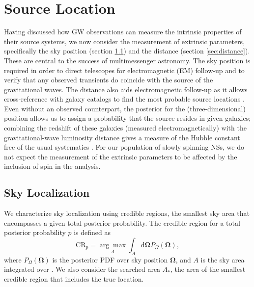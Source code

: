 \section{Source Location}\label{sec:extrinsic}

Having discussed how GW observations can measure the intrinsic properties of their source systems, we now consider the measurement of extrinsic parameters, specifically the sky position (section \ref{sec:sky}) and the distance (section \ref{sec:distance}). These are central to the success of multimessenger astronomy. The sky position is required in order to direct telescopes for electromagnetic (EM) follow-up and to verify that any observed transients do coincide with the source of the gravitational waves. The distance also aids electromagnetic follow-up as it allows cross-reference with galaxy catalogs to find the most probable source locations \citep{Nissanke_2012,Hanna:2013,Fan_2014,Blackburn:2014rqa}. Even without an observed counterpart, the posterior for the (three-dimensional) position allows us to assign a probability that the source resides in given galaxies; combining the redshift of these galaxies (measured electromagnetically) with the gravitational-wave luminosity distance gives a measure of the Hubble constant free of the usual systematics \citep{Schutz_1986,Del_Pozzo_2012}. For our population of slowly spinning NSs, we do not expect the measurement of the extrinsic parameters to be affected by the inclusion of spin in the analysis.

\subsection{Sky Localization}\label{sec:sky}

We characterize sky localization using credible regions, the smallest sky area that encompasses a given total posterior probability. The credible region for a total posterior probability $p$ is defined as
\begin{equation}
\mathrm{CR}_p = \underset{A}{\arg\!\max} \int_A \mathrm{d}\boldsymbol{\Omega} P_{\Omega}(\boldsymbol{\Omega}),
\label{eq:CR}
\end{equation}
where $P_{\Omega}(\boldsymbol{\Omega})$ is the posterior PDF over sky position $\boldsymbol{\Omega}$, and $A$ is the sky area integrated over \citep{Sidery_2014}. We also consider the searched area $A_\ast$, the area of the smallest credible region that includes the true location.


